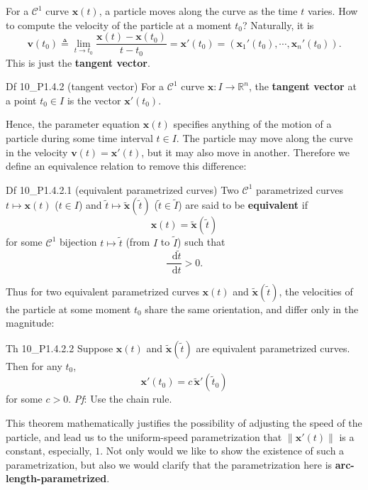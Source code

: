 \documentclass{article}
\newcommand{\dif}{\mathop{}\!\mathrm{d}}
\begin{document}
For a $\mathcal{C}^1$ curve $\pmb{x}(t)$, a particle moves along the curve as the time $t$ varies. How to compute the velocity of the particle at a moment $t_0$? Naturally, it is
$$ \pmb{v}(t_0) \triangleq \lim_{t\rightarrow t_0} \frac{\pmb{x}(t) - \pmb{x}(t_0)}{t-t_0} = \pmb{x}'(t_0) = (\pmb{x}_1'(t_0), \cdots, \pmb{x}_n'(t_0)). $$
This is just the \textbf{tangent vector}.

\begin{Df}{Df 10\_P1.4.2 (tangent vector)}
    For a $\mathcal{C}^1$ curve $\pmb{x}: I\rightarrow \mathbb{R}^n$, the \textbf{tangent vector} at a point $t_0\in I$ is the vector $\pmb{x}'(t_0)$.
\end{Df}

Hence, the parameter equation $\pmb{x}(t)$ specifies anything of the motion of a particle during some time interval $t\in I$. The particle may move along the curve in the velocity $\pmb{v}(t) = \pmb{x}'(t)$, but it may also move in another. Therefore we define an equivalence relation to remove this difference:

\begin{Df}{Df 10\_P1.4.2.1 (equivalent parametrized curves)}
    Two $\mathcal{C}^1$ parametrized curves $t\mapsto \pmb{x}(t)$ ($t\in I$) and $\tilde{t}\mapsto \tilde{\pmb{x}}(\tilde{t})$ ($\tilde{t}\in \tilde{I}$) are said to be \textbf{equivalent} if 
    $$ \pmb{x}(t) = \tilde{\pmb{x}}(\tilde{t}) $$
    for some $\mathcal{C}^1$ bijection $t\mapsto \tilde{t}$ (from $I$ to $\tilde{I}$) such that
    $$ \frac{\dif\tilde{t}}{\dif t} > 0. $$
\end{Df}

Thus for two equivalent parametrized curves $\pmb{x}(t)$ and $\tilde{\pmb{x}}(\tilde{t})$, the velocities of the particle at some moment $t_0$ share the same orientation, and differ only in the magnitude:

\begin{Th}{Th 10\_P1.4.2.2}
    Suppose $\pmb{x}(t)$ and $\tilde{\pmb{x}}(\tilde{t})$ are equivalent parametrized curves. Then for any $t_0$,
    $$ \pmb{x}'(t_0) = c\, \tilde{\pmb{x}}'(\tilde{t}_0) $$
    for some $c>0$.
    \tcblower
    \textit{Pf}: Use the chain rule.
\end{Th}

This theorem mathematically justifies the possibility of adjusting the speed of the particle, and lead us to the uniform-speed parametrization that $\|\pmb{x}'(t)\|$ is a constant, especially, $1$. Not only would we like to show the existence of such a parametrization, but also we would clarify that the parametrization here is \textbf{arc-length-parametrized}.
\end{document}
